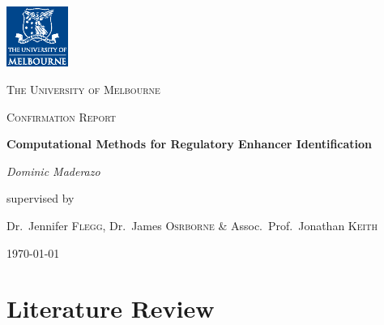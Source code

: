 \documentclass[12pt,a4paper]{article}
\author{D Maderazo}
\begin{document}
\begin{titlepage}
	\centering
	\includegraphics[width=0.15\textwidth]{PRIMARY_A_Vertical_Housed_CMYK.eps}\par\vspace{1cm}
	{\scshape\LARGE The University of Melbourne \par}
	\vspace{1cm}
	{\scshape\Large Confirmation Report\par}
	\vspace{1.5cm}
	{\huge\bfseries Computational Methods for Regulatory Enhancer Identification\par}
	\vspace{2cm}
	{\Large\itshape Dominic Maderazo\par}
	\vfill
	supervised by\par
	Dr.~Jennifer \textsc{Flegg}, Dr.~James \textsc{Osrborne} \& Assoc.~Prof.~Jonathan \textsc{Keith}

	\vfill

	{\large \today\par}
\end{titlepage}
    

    \section{Literature Review}
\end{document}
